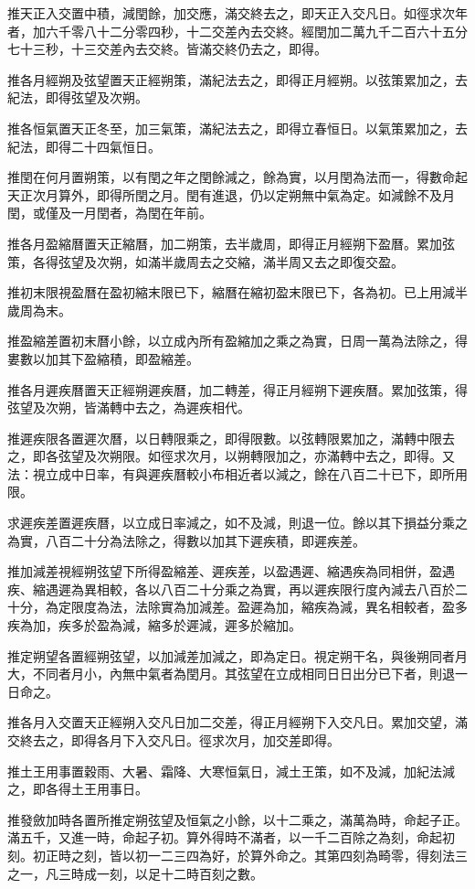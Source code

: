 推天正入交置中積，減閏餘，加交應，滿交終去之，即天正入交凡日。如徑求次年者，加六千零八十二分零四秒，十二交差內去交終。經閏加二萬九千二百六十五分七十三秒，十三交差內去交終。皆滿交終仍去之，即得。

推各月經朔及弦望置天正經朔策，滿紀法去之，即得正月經朔。以弦策累加之，去紀法，即得弦望及次朔。

推各恒氣置天正冬至，加三氣策，滿紀法去之，即得立春恒日。以氣策累加之，去紀法，即得二十四氣恒日。

推閏在何月置朔策，以有閏之年之閏餘減之，餘為實，以月閏為法而一，得數命起天正次月算外，即得所閏之月。閏有進退，仍以定朔無中氣為定。如減餘不及月閏，或僅及一月閏者，為閏在年前。

推各月盈縮曆置天正縮曆，加二朔策，去半歲周，即得正月經朔下盈曆。累加弦策，各得弦望及次朔，如滿半歲周去之交縮，滿半周又去之即復交盈。

推初末限視盈曆在盈初縮末限已下，縮曆在縮初盈末限已下，各為初。已上用減半歲周為末。

推盈縮差置初末曆小餘，以立成內所有盈縮加之乘之為實，日周一萬為法除之，得婁數以加其下盈縮積，即盈縮差。

推各月遲疾曆置天正經朔遲疾曆，加二轉差，得正月經朔下遲疾曆。累加弦策，得弦望及次朔，皆滿轉中去之，為遲疾相代。

推遲疾限各置遲次曆，以日轉限乘之，即得限數。以弦轉限累加之，滿轉中限去之，即各弦望及次朔限。如徑求次月，以朔轉限加之，亦滿轉中去之，即得。又法：視立成中日率，有與遲疾曆較小布相近者以減之，餘在八百二十已下，即所用限。

求遲疾差置遲疾曆，以立成日率減之，如不及減，則退一位。餘以其下損益分乘之為實，八百二十分為法除之，得數以加其下遲疾積，即遲疾差。

推加減差視經朔弦望下所得盈縮差、遲疾差，以盈遇遲、縮遇疾為同相併，盈遇疾、縮遇遲為異相較，各以八百二十分乘之為實，再以遲疾限行度內減去八百於二十分，為定限度為法，法除實為加減差。盈遲為加，縮疾為減，異名相較者，盈多疾為加，疾多於盈為減，縮多於遲減，遲多於縮加。

推定朔望各置經朔弦望，以加減差加減之，即為定日。視定朔干名，與後朔同者月大，不同者月小，內無中氣者為閏月。其弦望在立成相同日日出分已下者，則退一日命之。

推各月入交置天正經朔入交凡日加二交差，得正月經朔下入交凡日。累加交望，滿交終去之，即得各月下入交凡日。徑求次月，加交差即得。

推土王用事置穀雨、大暑、霜降、大寒恒氣日，減土王策，如不及減，加紀法減之，即各得土王用事日。

推發斂加時各置所推定朔弦望及恒氣之小餘，以十二乘之，滿萬為時，命起子正。滿五千，又進一時，命起子初。算外得時不滿者，以一千二百除之為刻，命起初刻。初正時之刻，皆以初一二三四為好，於算外命之。其第四刻為畸零，得刻法三之一，凡三時成一刻，以足十二時百刻之數。

